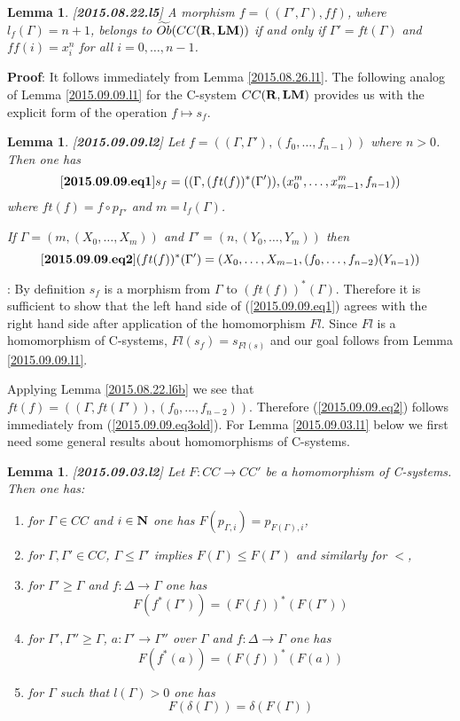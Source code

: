 \documentclass[11pt]{article}
\newenvironment{eq}{\begin{equation}}{\end{equation}}
\newenvironment{proof}{{\bf Proof}:}{\vskip 5mm }
\newtheorem{lemma}[proposition]{Lemma}
\newcommand{\llabel}[1]{\label{#1}[{\bf #1}]}
\newcommand{\sr}{\rightarrow}
\newcommand{\nn}{{\bf N\rm}}
\newcommand{\nat}{\nn}
\newcommand{\rr}{{\bf R}}
\newcommand{\lm}{{\bf LM}}
\newcommand{\wt}{\widetilde}
\begin{document}
%
\begin{lemma}
\llabel{2015.08.22.l5}
A morphism $f=((\Gamma',\Gamma),ff)$, where $l_f(\Gamma)=n+1$,  belongs to $\wt{Ob}(CC(\rr,\lm))$ if and only if $\Gamma'=ft(\Gamma)$ and $ff(i)=x^n_i$ for all $i=0,\dots,n-1$. 
\end{lemma}
%
\begin{proof}
It follows immediately from Lemma \ref{2015.08.26.l1}.
\end{proof}
%
The following analog of Lemma \ref{2015.09.09.l1} for the C-system $CC(\rr,\lm)$ provides us with the explicit form of the operation $f\mapsto s_f$.
%
\begin{lemma}
\llabel{2015.09.09.l2}
Let $f=((\Gamma,\Gamma'),(f_0,\dots,f_{n-1}))$ where $n>0$. Then one has
%
\begin{eq}\llabel{2015.09.09.eq1}
s_f=((\Gamma,(ft(f))^*(\Gamma')),(x_0^m,\dots,x_{m-1}^m,f_{n-1}))
\end{eq}
%
where $ft(f)=f\circ p_{\Gamma'}$ and $m=l_f(\Gamma)$.

If $\Gamma=(m,(X_0,\dots,X_m))$ and $\Gamma'=(n,(Y_0,\dots,Y_m))$ then
%
\begin{eq}\llabel{2015.09.09.eq2}
(ft(f))^*(\Gamma')=(X_0,\dots,X_{m-1},(f_0,\dots,f_{n-2})(Y_{n-1}))
\end{eq}
%
\end{lemma}
%
\begin{proof}
By definition $s_f$ is a morphism from $\Gamma$ to $(ft(f))^*(\Gamma)$. Therefore it is sufficient to show that the left hand side of (\ref{2015.09.09.eq1}) agrees with the right hand side after application of the homomorphism $Fl$. Since $Fl$ is a homomorphism of C-systems, $Fl(s_f)=s_{Fl(s)}$ and our goal follows from Lemma \ref{2015.09.09.l1}.

Applying Lemma \ref{2015.08.22.l6b} we see that $ft(f)=((\Gamma,ft(\Gamma')),(f_0,\dots,f_{n-2}))$. Therefore (\ref{2015.09.09.eq2}) follows immediately from (\ref{2015.09.09.eq3old}). 
\end{proof}
%
For Lemma \ref{2015.09.03.l1} below we first need some general results about homomorphisms of C-systems.
%
\begin{lemma}
\llabel{2015.09.03.l2}
Let $F:CC\sr CC'$ be a homomorphism of C-systems. Then one has:
%
\begin{enumerate}
\item for $\Gamma\in CC$ and $i\in\nat$ one has $F(p_{\Gamma,i})=p_{F(\Gamma),i}$,
\item for $\Gamma,\Gamma'\in CC$, $\Gamma\le \Gamma'$ implies $F(\Gamma)\le F(\Gamma')$ and similarly for $<$,
\item for $\Gamma'\ge \Gamma$ and $f:\Delta\sr \Gamma$ one has
%
$$F(f^*(\Gamma'))=(F(f))^*(F(\Gamma'))$$
%
\item for $\Gamma',\Gamma''\ge \Gamma$, $a:\Gamma'\sr \Gamma''$ over $\Gamma$ and $f:\Delta\sr \Gamma$ one has
%
$$F(f^*(a))=(F(f))^*(F(a))$$
%
\item for $\Gamma$ such that $l(\Gamma)>0$ one has
%
$$F(\delta(\Gamma))=\delta(F(\Gamma))$$
%
\end{enumerate}
\end{lemma}
\end{document}
